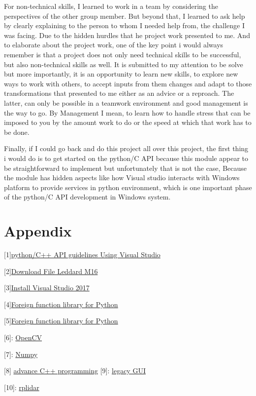 \documentclass[onecolumn, draftclsnofoot,10pt, compsoc]{IEEEtran}
\begin{document}
For non-technical skills, I learned to work in a team by considering the perspectives of the other group member. But beyond that, I learned to ask help by clearly explaining to the person to whom I needed help from, the challenge I was facing. Due to the hidden hurdles that he project work presented to me. And to elaborate about the project work, one of the key point i would always remember is that a project does not only need technical skills to be successful, but also non-technical skills  as well. It is submitted to my attention to be solve  but more importantly, it is an opportunity to learn new skills, to explore new ways to work with others, to accept inputs from them changes and adapt to those transformations that presented to me either as an advice or a reproach. The latter, can only be possible in a teamwork environment and good management is the way to go. By Management I mean, to learn how to handle stress that can be imposed to you by the amount work to do or the speed at which that work has to be done.  

Finally, if I could go back and do this project all over this project, the first thing i would do is to get started on the python/C API because this module appear to be straightforward to implement but unfortunately that is not the case, Because the module has hidden aspects like how Visual studio interacts with Windows platform to provide services in python environment, which is one important phase of the python/C API development in Windows system. 


\section{Appendix}
[1]\hyperlink{https://docs.microsoft.com/en-us/visualstudio/python/working-with-c-cpp-python-in-visual-studio}{python/C++ API guidelines Using Visual Studio}

[2]\hyperlink{https://support.leddartech.com/downloads/files/91-leddarinstaller-exe}{Download File Leddard M16}

[3]\hyperlink{ https://docs.microsoft.com/en-us/visualstudio/install/install-visual-studio}{Install Visual Studio 2017}

[4]\hyperlink{https://docs.python.org/3/library/ctypes.html\# loading-shared-libraries}{Foreign function  library for Python}

[5]\hyperlink{https://docs.python.org/3/extending/building.html}{Foreign function  library for Python}

[6]: \hyperlink{https://www.lfd.uci.edu/\~gohlke/pythonlibs/\#opencv}{OpenCV} 
 
 [7]: \hyperlink{https://docs.scipy.org/doc/scipy/reference/generated/scipy.spatial.distance.cdist.html}{Numpy}
 
 [8] \hyperlink {http://www.cs.ukzn.ac.za/~hughm/ap/notes/apNotes.pdf}{advance C++ programming}
[9]: \hyperlink{https://wiki.python.org/moin/GuiProgramming} {legacy GUI}

[10]: \hyperlink{https://pypi.python.org/pypi/rplidar}{rplidar}



 


 
 
\end{document}
